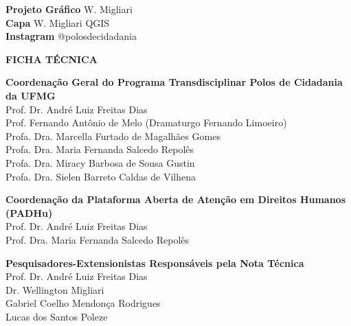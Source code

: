 \documentclass[12pt]{article}
\begin{document}
\hfill%
\begin{minipage}{18cm}
\vspace{2cm}
\noindent\textbf{Projeto Gráfico} W. Migliari \textsc{}\\
\noindent\textbf{Capa} W. Migliari QGIS\\
\noindent\textbf{Instagram} @polosdecidadania\\
\vspace{2cm}
\end{minipage}

\newpage


\thispagestyle{empty}

\vspace{1cm}
\hfill\allowbreak
\begin{minipage}{\textwidth}
\noindent\textbf{FICHA TÉCNICA}\\
\vspace{2.5cm}

\noindent\textbf{Coordenação Geral do Programa Transdisciplinar Polos de Cidadania da UFMG}\\

Prof. Dr. André Luiz Freitas Dias\\
Prof. Fernando Antônio de Melo (Dramaturgo Fernando Limoeiro)\\
Profa. Dra. Marcella Furtado de Magalhães Gomes\\
Profa. Dra. Maria Fernanda Salcedo Repolês\\
Profa. Dra. Miracy Barbosa de Sousa Gustin\\
Profa. Dra. Sielen Barreto Caldas de Vilhena\\
\vspace{1cm}

\noindent\textbf{Coordenação da Plataforma Aberta de Atenção em Direitos Humanos (PADHu)}\\

Prof. Dr. André Luiz Freitas Dias\\
Prof. Dra. Maria Fernanda Salcedo Repolês
\vspace{1cm}

\noindent\textbf{Pesquisadores-Extensionistas Responsáveis pela Nota Técnica}\\

Prof. Dr. André Luiz Freitas Dias\\
Dr. Wellington Migliari\\
Gabriel Coelho Mendonça Rodrigues\\
Lucas dos Santos Poleze\\
\end{minipage}
\end{document}
